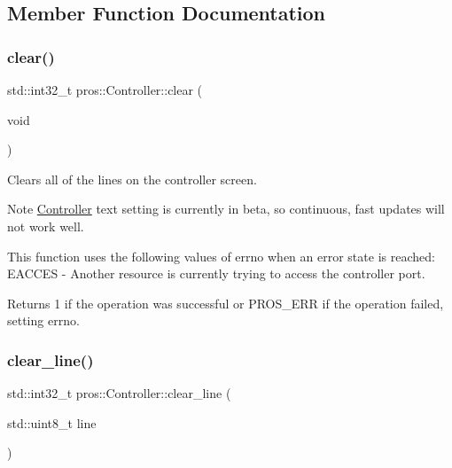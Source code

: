 \subsection{Member Function Documentation}
\mbox{\label{classpros_1_1Controller_a49a332fe032c3aaf94e24bb3a51945e1}} 
\subsubsection{\texorpdfstring{clear()}{clear()}}
{\footnotesize\ttfamily std\+::int32\+\_\+t pros\+::\+Controller\+::clear (\begin{DoxyParamCaption}\item[{void}]{ }\end{DoxyParamCaption})}



Clears all of the lines on the controller screen. 

\begin{DoxyNote}{Note}
\mbox{\hyperlink{classpros_1_1Controller}{Controller}} text setting is currently in beta, so continuous, fast updates will not work well.
\end{DoxyNote}
This function uses the following values of errno when an error state is reached\+: E\+A\+C\+C\+ES -\/ Another resource is currently trying to access the controller port.

\begin{DoxyReturn}{Returns}
1 if the operation was successful or P\+R\+O\+S\+\_\+\+E\+RR if the operation failed, setting errno. 
\end{DoxyReturn}
\mbox{\label{classpros_1_1Controller_a9f65f6c26d55619a658aa103d3532583}} 
\subsubsection{\texorpdfstring{clear\_line()}{clear\_line()}}
{\footnotesize\ttfamily std\+::int32\+\_\+t pros\+::\+Controller\+::clear\+\_\+line (\begin{DoxyParamCaption}\item[{std\+::uint8\+\_\+t}]{line }\end{DoxyParamCaption})}



